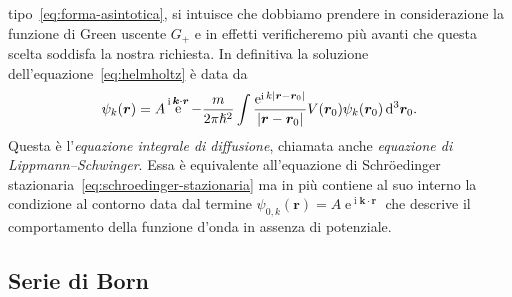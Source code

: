 \documentclass[a4paper,fleqn,twoside,12pt]{article}
\newcommand*{\dd}{\mathop{}\!\mathrm{d}} %
\DeclareMathOperator{\e}{\mathrm{e}} %
\DeclareMathOperator{\uimm}{\mathrm{i}} %
\DeclarePairedDelimiter{\abs}{\lvert}{\rvert}
\begin{document}
tipo~\eqref{eq:forma-asintotica}, si intuisce che dobbiamo prendere in
considerazione la funzione di Green uscente $G_{+}$ e in effetti verificheremo
più avanti che questa scelta soddisfa la nostra richiesta.  In definitiva la
soluzione dell'equazione~\eqref{eq:helmholtz} è data da
\begin{equation}
  \label{eq:lippmann-schwinger}
  \psi_{k}(\bm{r}) = A\e^{\uimm \bm{k}\cdot\bm{r}} - \frac{m}{2\pi\hslash^{2}}
  \int \frac{\e^{\uimm k\abs{\bm{r} - \bm{r}_{0}}}}{\abs{\bm{r} - \bm{r}_{0}}}
  V(\bm{r}_{0}) \psi_{k}(\bm{r}_{0}) \dd^{3}\bm{r}_{0}.
\end{equation}
Questa è l'\emph{equazione integrale di diffusione}, chiamata anche
\emph{equazione di Lippmann–Schwinger}.  Essa è equivalente all'equazione di
Schröedinger stazionaria~\eqref{eq:schroedinger-stazionaria} ma in più contiene
al suo interno la condizione al contorno data dal termine
$\psi_{0,k}(\bm{r}) = A\e^{\uimm \bm{k}\cdot\bm{r}}$ che descrive il
comportamento della funzione d'onda in assenza di potenziale.

\subsection{Serie di Born}
\label{sec:serie-born}
\end{document}
